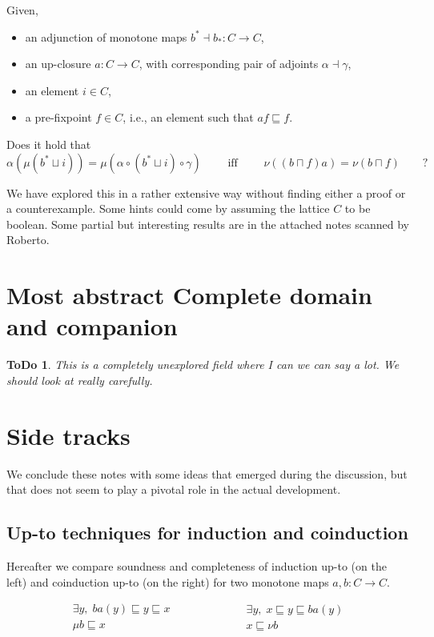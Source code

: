 \documentclass[smallcondensed,envcountsect,envcountsame]{svjour3}     %
\newtheorem{todo}[theorem]{\bf ToDo}
\begin{document}
\medskip

Given, 
\begin{itemize}
\item an adjunction of monotone maps $b^*\dashv b_* \colon C\to C$,
\item an up-closure $a\colon C \to C$, with corresponding pair of adjoints $\alpha \dashv \gamma$,
\item an element $i\in C$,
\item a pre-fixpoint $f\in C$, i.e., an element such that $af \sqsubseteq f$.
\end{itemize}
Does it hold that
$$\alpha (\mu(b^* \sqcup i)) = \mu (\alpha \circ  (b^* \sqcup i) \circ \gamma ) \qquad  \text{ iff } \qquad \nu((b\sqcap f)a) = \nu( b \sqcap f) \qquad \text{?}$$


We have explored this in a rather extensive way without finding either a proof or a counterexample. Some hints could come by assuming the lattice $C$ to be boolean.
Some partial but interesting results are in the attached notes scanned by Roberto.


\section{Most abstract Complete domain and companion}

\begin{todo}
This is a completely unexplored field where I can we can say a lot. We should look at really carefully.
\end{todo}


\section{Side tracks}
We conclude these notes with some ideas that emerged during the discussion, but that does not seem to play a pivotal role in the actual development.


\subsection{Up-to techniques for induction and coinduction}

Hereafter we compare soundness and completeness of induction up-to (on the left) and coinduction up-to (on the right) for two monotone maps $a,b\colon C\to C$.

 \begin{equation}\label{eq:comparisonincoin}
 \begin{array}{c}
    \exists y, \;  ba(y) \sqsubseteq y\sqsubseteq x \\
    \hline %
    \mu b \sqsubseteq x
\end{array}
\qquad \qquad \qquad
 \begin{array}{c}
    \exists y, \; x \sqsubseteq y\sqsubseteq ba(y)\\
    \hline %
    x \sqsubseteq \nu b
\end{array}
\end{equation}
\end{document}
